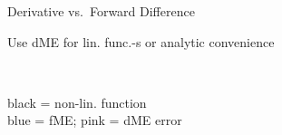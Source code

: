 \documentclass[10pt,compress,t,notes=noshow, xcolor=table]{beamer}
\begin{document}
\begin{framev}[align=top]{Derivative vs.\ Forward Difference}
{\begin{itemizeM}
\item<2-> Use dME for lin. func.-s or analytic convenience
\end{itemizeM}
}{
\spacer[0]
\centering
{}\\
\begin{scriptsize}
black = non-lin. function\\
blue = fME; pink = dME error
\end{scriptsize}
}
\end{framev}
\end{document}
